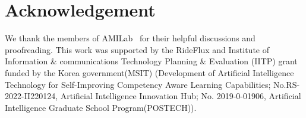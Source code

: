 \vspace{-1mm}
\section*{Acknowledgement}
We thank the members of AMILab~\cite{ami} for their helpful discussions and proofreading. This work was supported by the RideFlux and Institute of Information \& communications Technology Planning \& Evaluation (IITP) grant funded by the Korea government(MSIT) (Development of Artificial Intelligence Technology for Self-Improving Competency Aware Learning Capabilities; No.RS-2022-II220124, Artificial Intelligence Innovation
Hub; No. 2019-0-01906, Artificial Intelligence Graduate
School Program(POSTECH)).